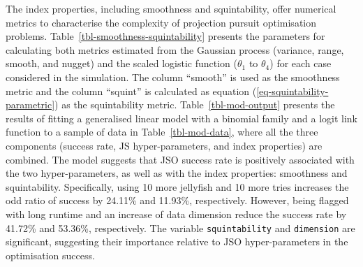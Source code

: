 \documentclass[
  12pt,
]{interact}
\theoremstyle{plain}
\begin{document}
The index properties, including smoothness and squintability, offer
numerical metrics to characterise the complexity of projection pursuit
optimisation problems. Table~\ref{tbl-smoothness-squintability} presents
the parameters for calculating both metrics estimated from the Gaussian
process (variance, range, smooth, and nugget) and the scaled logistic
function (\(\theta_1\) to \(\theta_4\)) for each case considered in the
simulation. The column ``smooth'' is used as the smoothness metric and
the column ``squint'' is calculated as equation
(\ref{eq-squintability-parametric}) as the squintability metric.
Table~\ref{tbl-mod-output} presents the results of fitting a generalised
linear model with a binomial family and a logit link function to a
sample of data in Table~\ref{tbl-mod-data}, where all the three
components (success rate, JS hyper-parameters, and index properties) are
combined. The model suggests that JSO success rate is positively
associated with the two hyper-parameters, as well as with the index
properties: smoothness and squintability. Specifically, using 10 more
jellyfish and 10 more tries increases the odd ratio of success by
24.11\% and 11.93\%, respectively. However, being flagged with long
runtime and an increase of data dimension reduce the success rate by
41.72\% and 53.36\%, respectively. The variable \texttt{squintability}
and \texttt{dimension} are significant, suggesting their importance
relative to JSO hyper-parameters in the optimisation success.
\end{document}
